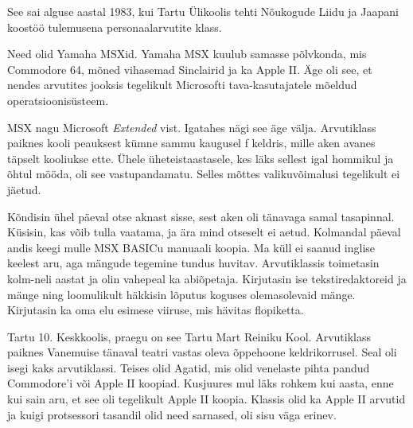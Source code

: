 
See sai alguse aastal 1983, kui Tartu 
Ülikoolis tehti Nõukogude Liidu ja Jaapani koostöö 
tulemusena personaalarvutite klass.


Need olid Yamaha MSXid. Yamaha MSX kuulub samasse põlvkonda, mis Commodore 64, mõned vihasemad Sinclairid ja 
ka Apple II. Äge oli see, et nendes arvutites jooksis 
tegelikult Microsofti tava-kasutajatele mõeldud operatsioonisüsteem.


MSX nagu Microsoft \emph{Extended} vist. Igatahes nägi see äge välja. Arvutiklass paiknes kooli peauksest kümne sammu kaugusel f
keldris, mille aken avanes täpselt kooliukse ette. Ühele üheteistaastasele, kes läks sellest igal hommikul ja õhtul mööda, 
oli see vastupandamatu. Selles mõttes valikuvõimalusi tegelikult 
ei jäetud. 


Kõndisin ühel päeval otse aknast sisse, sest 
aken oli tänavaga samal tasapinnal. Küsisin, kas võib tulla vaatama, ja ära mind otseselt ei aetud. Kolmandal päeval 
andis keegi mulle MSX BASICu 
manuaali koopia. Ma küll ei saanud 
inglise keelest aru, aga mängude tegemine tundus huvitav. 
Arvutiklassis toimetasin kolm-neli aastat ja olin vahepeal ka abiõpetaja. Kirjutasin ise tekstiredaktoreid ja mänge ning loomulikult häkkisin 
lõputus koguses olemasolevaid mänge. Kirjutasin ka oma elu esimese viiruse, mis hävitas flopiketta. 


Tartu 10. Keskkoolis, praegu on see
Tartu Mart Reiniku Kool.
 Arvutiklass paiknes Vanemuise tänaval teatri vastas 
oleva õppehoone keldrikorrusel. 
Seal oli isegi kaks arvutiklassi. Teises olid 
Agatid, mis olid venelaste pihta pandud 
Commodore'i või Apple II koopiad. Kusjuures mul läks rohkem kui aasta, enne kui sain aru, et see oli tegelikult 
Apple II koopia. Klassis olid ka Apple 
II arvutid ja kuigi protsessori tasandil olid need sarnased, 
oli sisu väga erinev. 

